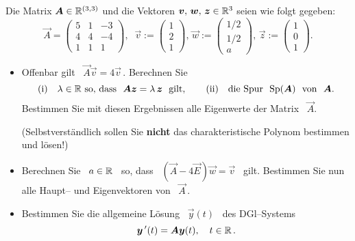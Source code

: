 {
Die Matrix $\boldsymbol A\in{\mathbb{R}}^{(3,3)}$ und die Vektoren $\boldsymbol{v},\,\boldsymbol{w},\,\boldsymbol{z}\in{\mathbb{R}}^3$ seien wie folgt gegeben:
$$\vec A=\begin{pmatrix} 5 & 1 & -3 \\
      4 & 4 & -4 \\ 1 & 1 & 1\end{pmatrix},\;\;
\vec{v}:=\begin{pmatrix}1\\2\\1\end{pmatrix},\,
\vec{w}:=\begin{pmatrix}1/2\\1/2\\a\end{pmatrix},\,
\vec{z}:=\begin{pmatrix}1\\0\\1\end{pmatrix}.$$

\begin{itemize}
\item
Offenbar gilt \ $\vec A\vec{v}= 4\vec{v}$\,. Berechnen Sie
$$\mbox{(i)}\quad\mbox{$\lambda\in{\R}$ so, dass \ $\vec A\vec{z}=\lambda\,\vec{z}$ \ gilt},\qquad
\mbox{(ii)}\quad\mbox{die Spur \ Sp$(\vec A)$ \ von \ $\vec A$}.$$
Bestimmen Sie mit diesen Ergebnissen alle Eigenwerte der Matrix \ $\vec A$.

(Selbstverständlich sollen Sie \textbf{nicht} das charakteristische Polynom bestimmen und lösen!)

\item Berechnen Sie \ $a\in{\mathbb{R}}$ \ so, dass \ $(\vec A-4\vec E)\vec{w}=\vec{v}$ \ gilt. Bestimmen Sie nun alle Haupt-- und Eigenvektoren von \ $\vec A$\,.

\item Bestimmen Sie die allgemeine Lösung \ $\vec{y}(t)$ \ des DGl--Systems
$$\boldsymbol{y}{\,'}(t)=\boldsymbol A\boldsymbol{y}(t),\quad t\in {\mathbb{R}}\,.$$   
\end{itemize}
}
